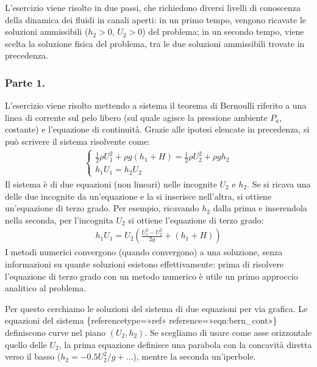 \documentclass[letterpaper,10pt,italian]{jupyterBook}
\begin{document}
\sphinxAtStartPar
L’esercizio viene risolto in due passi, che richiedono diversi livelli
di conoscenza della dinamica dei fluidi in canali aperti: in un primo
tempo, vengono ricavate le soluzioni ammissibili (\(h_2 > 0\), \(U_2 > 0\))
del problema; in un secondo tempo, viene scelta la soluzione fisica del
problema, tra le due soluzioni ammissibili trovate in precedenza.


\subsubsection{Parte 1.}
\label{\detokenize{polimi/fluidmechanics-ita/template/capitoli/05_bernoulli/0502in:parte-1}}
\sphinxAtStartPar
L’esercizio viene risolto mettendo a sistema il teorema di Bernoulli
riferito a una linea di corrente sul pelo libero (sul quale agisce la
pressione ambiente \(P_a\), costante) e l’equazione di continuità. Grazie
alle ipotesi elencate in precedenza, si può scrivere il sistema
risolvente come:
\begin{equation*}
\begin{split}\label{eqn:bern_cont}
  \begin{cases}
    \frac{1}{2}\rho U_1^2 + \rho g(h_1+H) = \frac{1}{2}\rho U_2^2 +
    \rho g h_2 \\
    h_1 U_1 = h_2 U_2
  \end{cases}\end{split}
\end{equation*}
\sphinxAtStartPar
Il sistema è di due equazioni (non lineari) nelle incognite \(U_2\) e
\(h_2\). Se si ricava una delle due incognite da un’equazione e la si
inserisce nell’altra, si ottiene un’equazione di terzo grado. Per
esempio, ricavando \(h_2\) dalla prima e inserendola nella seconda, per
l’incognita \(U_2\) si ottiene l’equazione di terzo grado:
\begin{equation*}
\begin{split}h_1 U_1 = U_2 \displaystyle\left( \frac{U_1^2 - U_2^2}{2 g} + (h_1 + H)    \right)\end{split}
\end{equation*}
\sphinxAtStartPar
I metodi numerici convergono (quando convergono) a una soluzione, senza
informazioni su quante soluzioni esistono effettivamente: prima di
risolvere l’equazione di terzo grado con un metodo numerico è utile un
primo approccio analitico al problema.

\sphinxAtStartPar
Per questo cerchiamo le soluzioni del sistema di due equazioni per via
grafica. Le equazioni del sistema
\{reference\sphinxhyphen{}type=»ref»
reference=»eqn:bern\_cont»\} definiscono curve nel piano \((U_2,h_2)\). Se
scegliamo di usare come asse orizzontale quello delle \(U_2\), la prima
equazione definisce una parabola con la concavità diretta verso il basso
(\(h_2 = - 0.5  U_2^2 /g +...\)), mentre la seconda un’iperbole.
\end{document}
